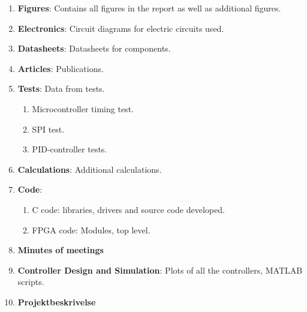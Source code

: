 \documentclass[../../main.tex]{subfiles}
\begin{document}
\begin{enumerate}
    \item \textbf{Figures}: Contains all figures in the report as well as additional figures.
    \item \textbf{Electronics}: Circuit diagrams for electric circuits used.
    \item \textbf{Datasheets}: Datasheets for components.
    \item \textbf{Articles}: Publications.
    \item \textbf{Tests}: Data from tests.
    \begin{enumerate}
        \item Microcontroller timing test.
        \item SPI test.
        \item PID-controller tests.
    \end{enumerate}
    \item \textbf{Calculations}: Additional calculations.
    \item \textbf{Code}: 
    \begin{enumerate}
        \item C code: libraries, drivers and source code developed.
        \item FPGA code: Modules, top level.
    \end{enumerate}
    \item \textbf{Minutes of meetings}
    \item \textbf{Controller Design and Simulation}: Plots of all the controllers, MATLAB scripts.
    \item \textbf{Projektbeskrivelse}
\end{enumerate}        
\end{document}
